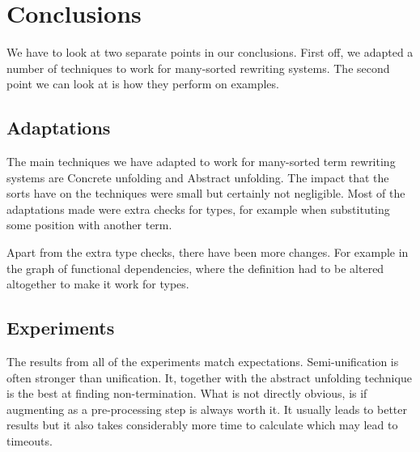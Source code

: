 \chapter{Conclusions}\label{conclusions}
We have to look at two separate points in our conclusions. First off, we adapted a number of techniques to work for many-sorted rewriting systems. The second point we can look at is how they perform on examples. 
\section{Adaptations}
The main techniques we have adapted to work for many-sorted term rewriting systems are Concrete unfolding and Abstract unfolding. The impact that the sorts have on the techniques were small but certainly not negligible. Most of the adaptations made were extra checks for types, for example when substituting some position with another term. 

Apart from the extra type checks, there have been more changes. For example in the graph of functional dependencies, where the definition had to be altered altogether to make it work for types.

\section{Experiments}
The results from all of the experiments match expectations. Semi-unification is often stronger than unification. It, together with the abstract unfolding technique is the best at finding non-termination. What is not directly obvious, is if augmenting as a pre-processing step is always worth it. It usually leads to better results but it also takes considerably more time to calculate which may lead to timeouts.